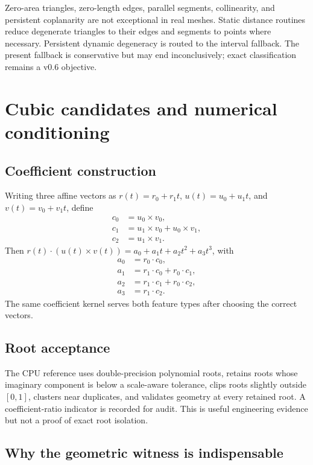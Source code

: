 \documentclass[11pt,a4paper,oneside]{book}
\begin{document}
Zero-area triangles, zero-length edges, parallel segments, collinearity, and persistent coplanarity are not exceptional in real meshes. Static distance routines reduce degenerate triangles to their edges and segments to points where necessary. Persistent dynamic degeneracy is routed to the interval fallback. The present fallback is conservative but may end inconclusively; exact classification remains a v0.6 objective.

\chapter{Cubic candidates and numerical conditioning}
\section{Coefficient construction}

Writing three affine vectors as $r(t)=r_0+r_1t$, $u(t)=u_0+u_1t$, and $v(t)=v_0+v_1t$, define
\[
\begin{aligned}
 c_0&=u_0\times v_0,\\
 c_1&=u_1\times v_0+u_0\times v_1,\\
 c_2&=u_1\times v_1.
\end{aligned}
\]
Then $r(t)\cdot(u(t)\times v(t))=a_0+a_1t+a_2t^2+a_3t^3$, with
\[
\begin{aligned}
 a_0&=r_0\cdot c_0,\\
 a_1&=r_1\cdot c_0+r_0\cdot c_1,\\
 a_2&=r_1\cdot c_1+r_0\cdot c_2,\\
 a_3&=r_1\cdot c_2.
\end{aligned}
\]
The same coefficient kernel serves both feature types after choosing the correct vectors.

\section{Root acceptance}

The CPU reference uses double-precision polynomial roots, retains roots whose imaginary component is below a scale-aware tolerance, clips roots slightly outside $[0,1]$, clusters near duplicates, and validates geometry at every retained root. A coefficient-ratio indicator is recorded for audit. This is useful engineering evidence but not a proof of exact root isolation.

\section{Why the geometric witness is indispensable}
\end{document}
